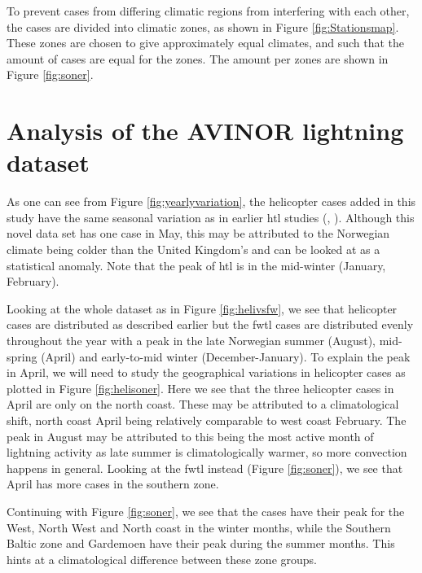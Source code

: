 To prevent cases from differing climatic regions from interfering with each other, the cases are divided into climatic zones, as shown in Figure \ref{fig:Stationsmap}. These zones are chosen to give approximately equal climates, and such that the amount of cases are equal for the zones. The amount per zones are shown in Figure \ref{fig:soner}.

\section{Analysis of the AVINOR lightning dataset}

As one can see from Figure \ref{fig:yearlyvariation}, the helicopter cases added in this study have the same seasonal variation as in earlier \acrshort{htl} studies (\cite{wilkinson2013}, \cite{lande1999}). Although this novel data set has one case in May, this may be attributed to the Norwegian climate being colder than the United Kingdom's and can be looked at as a statistical anomaly. Note that the peak of \acrlong{htl} is in the mid-winter (January, February). 

Looking at the whole dataset as in Figure \ref{fig:helivsfw}, we see that helicopter cases are distributed as described earlier but the \acrshort{fwtl} cases are distributed evenly throughout the year with a peak in the late Norwegian summer (August), mid-spring (April) and early-to-mid winter (December-January). To explain the peak in April, we will need to study the geographical variations  in helicopter cases as plotted in Figure \ref{fig:helisoner}. Here we see that the three helicopter cases in April are only on the north coast. These may be attributed to a climatological shift, north coast April being relatively comparable to west coast February. The peak in August may be attributed to this being the most active month of lightning activity as late summer is climatologically warmer, so more convection happens in general. Looking at the \acrshort{fwtl} instead (Figure \ref{fig:soner}), we see that April has more cases in the southern zone.

Continuing with Figure \ref{fig:soner}, we see that the cases have their peak for the West, North West and North coast in the winter months, while the Southern Baltic zone and Gardemoen have their peak during the summer months. This hints at a climatological difference between these zone groups.

